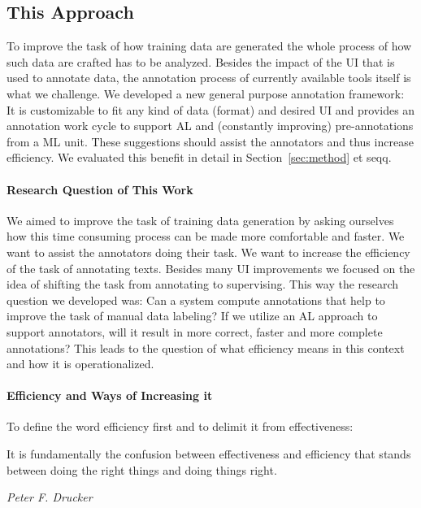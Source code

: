 \subsection{This Approach}
  To improve the task of how training data are generated the whole process of how such data are crafted has to be analyzed. Besides the impact of the \ac{UI} that is used to annotate data, the annotation process of currently available tools itself is what we challenge. We developed a new general purpose annotation framework: It is customizable to fit any kind of data (format) and desired \ac{UI} and provides an annotation work cycle to support \ac{AL} and (constantly improving) pre-annotations from a \ac{ML} unit. These suggestions should assist the annotators and thus increase efficiency. We evaluated this benefit in detail in Section~\ref{sec:method} et seqq.

  \paragraph{Research Question of This Work}
  We aimed to improve the task of training data generation by asking ourselves how this time consuming process can be made more comfortable and faster. We want to assist the annotators doing their task. We want to increase the efficiency of the task of annotating texts. Besides many \ac{UI} improvements we focused on the idea of shifting the task from annotating to supervising. This way the research question we developed was: Can a system compute annotations that help to improve the task of manual data labeling? If we utilize an \ac{AL} approach to support annotators, will it result in more correct, faster and more complete annotations? This leads to the question of what efficiency means in this context and how it is operationalized.

  \paragraph{Efficiency and Ways of Increasing it}
  \label{sec:approachEfficiency}

  To define the word efficiency first and to delimit it from effectiveness:

  \epigraph{It is fundamentally the confusion between effectiveness and efficiency that stands between doing the right things and doing things right.}{\textit{Peter F. Drucker}~\cite{drucker1963effectiveness}}

